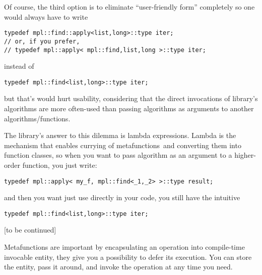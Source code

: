 \documentclass{kapproc}
\newcommand{\mfns}{meta\-func\-tions}
\begin{document}
Of course, the third option is to eliminate 
``user-friendly form'' completely so one would always 
have to write

{\small
\begin{codesamp}\begin{verbatim}
typedef mpl::find::apply<list,long>::type iter;
// or, if you prefer,
// typedef mpl::apply< mpl::find,list,long >::type iter;
\end{verbatim}
\end{codesamp}
}

instead of 

{\small
\begin{codesamp}\begin{verbatim}
typedef mpl::find<list,long>::type iter;
\end{verbatim}
\end{codesamp}
}

but that's would hurt usability, considering that the direct 
invocations of library's algorithms are more often-used than 
passing algorithms as arguments to another 
algorithms/functions. 

The library's answer to this dilemma is lambda expressions. 
Lambda is the mechanism that enables currying of 
\mfns\ and converting them into function classes, 
so when you want to pass  algorithm as an argument 
to a higher-order function, you just write:

{\small
\begin{codesamp}\begin{verbatim}
typedef mpl::apply< my_f, mpl::find<_1,_2> >::type result;
\end{verbatim}
\end{codesamp}
}

and then you want just use  directly in your code, 
you still have the intuitive

{\small
\begin{codesamp}\begin{verbatim}
typedef mpl::find<list,long>::type iter;
\end{verbatim}
\end{codesamp}
}


[to be continued]


Metafunctions are important by encapsulating an operation into 
compile-time invocable entity, they give you a possibility to 
defer its execution. You can store the entity, pass it around, 
and invoke the operation at any time you need.
\end{document}
